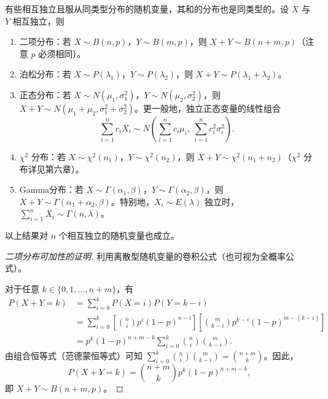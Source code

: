 ﻿\documentclass[lang=cn,11pt]{elegantbook}
\begin{document}
\begin{property}[常见分布的可加性]\label{prop:additivity}
有些相互独立且服从同类型分布的随机变量，其和的分布也是同类型的。设 $X$ 与 $Y$ 相互独立，则
\begin{enumerate}
    \item 二项分布：若 $X \sim B(n,p)$，$Y \sim B(m,p)$，则 $X + Y \sim B(n+m,p)$（注意 $p$ 必须相同）。
    \item 泊松分布：若 $X \sim P(\lambda_1)$，$Y \sim P(\lambda_2)$，则 $X + Y \sim P(\lambda_1 + \lambda_2)$。
    \item 正态分布：若 $X \sim N(\mu_1, \sigma_1^2)$，$Y \sim N(\mu_2, \sigma_2^2)$，则 $X + Y \sim N(\mu_1 + \mu_2, \sigma_1^2 + \sigma_2^2)$。更一般地，独立正态变量的线性组合
    \[
    \sum_{i=1}^{n}c_i X_i \sim N\!\left(\sum_{i=1}^{n}c_i\mu_i,\ \sum_{i=1}^{n}c_i^2\sigma_i^2\right).
    \]
    \item $\chi^2$ 分布：若 $X \sim \chi^2(n_1)$，$Y \sim \chi^2(n_2)$，则 $X + Y \sim \chi^2(n_1 + n_2)$（$\chi^2$ 分布详见第六章）。
    \item Gamma分布：若 $X \sim \Gamma(\alpha_1, \beta)$，$Y \sim \Gamma(\alpha_2, \beta)$，则 $X + Y \sim \Gamma(\alpha_1 + \alpha_2, \beta)$。特别地，$X_i \sim E(\lambda)$ 独立时，$\sum_{i=1}^{n}X_i \sim \Gamma(n, \lambda)$。
\end{enumerate}
以上结果对 $n$ 个相互独立的随机变量也成立。
\end{property}
\begin{proof}[二项分布可加性的证明]
利用离散型随机变量的卷积公式（也可视为全概率公式）。

对于任意 $k \in \{0, 1, \dots, n+m\}$，有
\begin{align*}
    P(X+Y=k) &= \sum_{i=0}^{k} P(X=i)P(Y=k-i) \\
    &= \sum_{i=0}^{k} \left[ \binom{n}{i} p^i (1-p)^{n-i} \right] \left[ \binom{m}{k-i} p^{k-i} (1-p)^{m-(k-i)} \right] \\
    &= p^k (1-p)^{n+m-k} \sum_{i=0}^{k} \binom{n}{i} \binom{m}{k-i}.
\end{align*}
由组合恒等式（范德蒙恒等式）可知 $\sum_{i=0}^{k} \binom{n}{i} \binom{m}{k-i} = \binom{n+m}{k}$。因此，
\[
    P(X+Y=k) = \binom{n+m}{k} p^k (1-p)^{n+m-k},
\]
即 $X+Y \sim B(n+m, p)$。
\end{proof}
\end{document}
